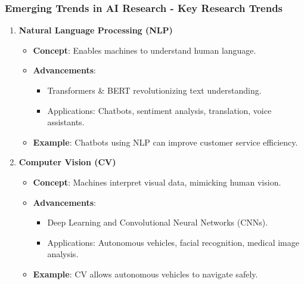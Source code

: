 \documentclass{beamer}
\begin{document}
\begin{frame}[fragile]
    \frametitle{Emerging Trends in AI Research - Key Research Trends}
    \begin{enumerate}
        \item \textbf{Natural Language Processing (NLP)}
            \begin{itemize}
                \item \textbf{Concept}: Enables machines to understand human language.
                \item \textbf{Advancements}:
                    \begin{itemize}
                        \item Transformers \& BERT revolutionizing text understanding.
                        \item Applications: Chatbots, sentiment analysis, translation, voice assistants.
                    \end{itemize}
                \item \textbf{Example}: Chatbots using NLP can improve customer service efficiency.
            \end{itemize}
        \item \textbf{Computer Vision (CV)}
            \begin{itemize}
                \item \textbf{Concept}: Machines interpret visual data, mimicking human vision.
                \item \textbf{Advancements}:
                    \begin{itemize}
                        \item Deep Learning and Convolutional Neural Networks (CNNs).
                        \item Applications: Autonomous vehicles, facial recognition, medical image analysis.
                    \end{itemize}
                \item \textbf{Example}: CV allows autonomous vehicles to navigate safely.
            \end{itemize}
    \end{enumerate}
\end{frame}
\end{document}
